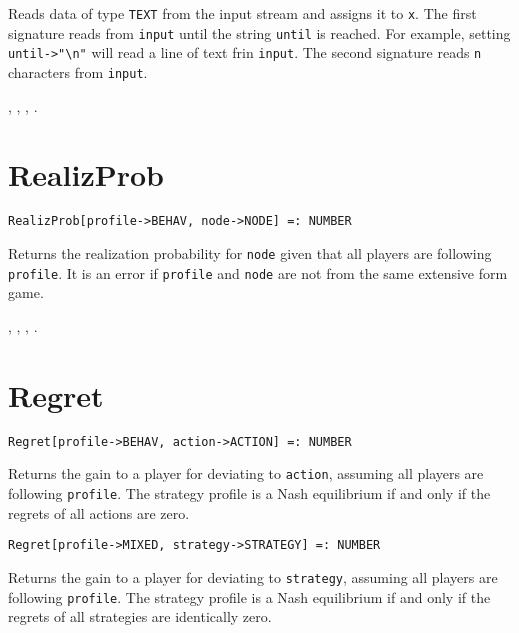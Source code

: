 \noindent
Reads data of type \verb+TEXT+ from the input stream and assigns it to
\verb+x+.  The first signature reads from \verb+input+ until the
string \verb+until+ is reached.  For example, setting
\verb+until->"\n"+ will read a line of text frin \verb+input+.  The
second signature reads \verb+n+ characters from \verb+input+.  

\seealso {}, ,
, .


\section*{RealizProb}\label{PrimRealizProb}
\begin{verbatim}
RealizProb[profile->BEHAV, node->NODE] =: NUMBER 
\end{verbatim}

\noindent
Returns the realization probability for \verb+node+ given that all players
are following \verb+profile+.  It is an error if \verb+profile+ and
\verb+node+ are not from the same extensive form game.

\seealso {},
, ,
.


\section*{Regret}\label{PrimRegret}
\begin{verbatim}
Regret[profile->BEHAV, action->ACTION] =: NUMBER 
\end{verbatim}

\noindent
Returns the gain to a player for deviating to \verb+action+, assuming
all players are following \verb+profile+.  The strategy profile is
a Nash equilibrium if and only if the regrets of all actions are zero.

\newsignature

\begin{verbatim}
Regret[profile->MIXED, strategy->STRATEGY] =: NUMBER 
\end{verbatim}

\noindent
Returns the gain to a player for deviating to \verb+strategy+, assuming
all players are following \verb+profile+.  The strategy profile is
a Nash equilibrium if and only if the regrets of all strategies are
identically zero.

